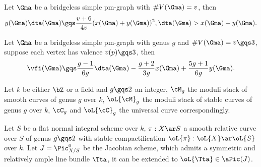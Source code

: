 \documentclass[article, a4paper, twoside]{universal}
\begin{document}
\begin{thm}
	Let $\Gma$ be a bridgeless simple pm-graph with $\#V(\Gma)=v$, then
	\[
		y(\Gma)\dta(\Gma)\gqs\frac{v+6}{4v}(x(\Gma)+y(\Gma))^{2}, \dta(\Gma)>x(\Gma)+y(\Gma).
	\]
\end{thm}

\begin{thm}
	Let $\Gma$ be a bridgeless simple pm-graph with genus $g$ and $\#V(\Gma)=v\gqs3$, suppose each vertex has valence $v(p)\gqs3$, then
	\[
		\vfi(\Gma)\gqs\frac{g-1}{6g}\dta(\Gma)-\frac{g+2}{3g}x(\Gma)+\frac{5g+1}{6g}y(\Gma).
	\]
\end{thm}





\begin{stp}
	Let $k$ be either $\bZ$ or a field and $g\gqs2$ an integer, $\cM_{g}$ the moduli stack of smooth curves of genus $g$ over $k$, $\oL{\cM}_{g}$ the moduli stack of stable curves of genus $g$ over $k$, $\cC_{g}$ and $\oL{\cC}_{g}$ the universal curve correspondingly.

	Let $S$ be a  flat normal integral scheme over $k$, $\pi:X\ar S$ a smooth relative curve over $S$ of genus $g\gqs2$ with stable compactification $\oL{\pi}:\oL{X}\ar\oL{S}$ over $k$. Let $J=\Pic_{X/S}^{0}$ be the Jacobian scheme, which admits a symmetric and relatively ample line bundle $\Tta$, it can be extended to $\oL{\Tta}\in\aPic(J)$.
\end{stp}
\end{document}
